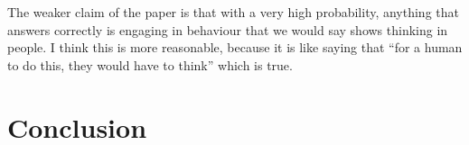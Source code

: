 \documentclass[
10pt, %
a4paper, %
oneside, %
headinclude,footinclude, %
BCOR5mm, %
]{scrartcl}
\begin{document}
The weaker claim of the paper is that with a very high probability, anything that answers correctly is engaging in behaviour that we would say shows thinking in people. I think this is more reasonable, because it is like saying that ``for a human to do this, they would have to think'' which is true.


\section{Conclusion}


\renewcommand{\refname}{\spacedlowsmallcaps{References}} %




\end{document}
